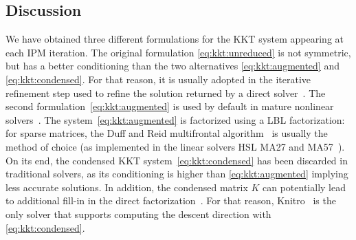 \subsection{Discussion}
We have obtained three different formulations for the KKT system
appearing at each IPM iteration.
The original formulation \eqref{eq:kkt:unreduced} is not symmetric, but
has a better conditioning than the two alternatives \eqref{eq:kkt:augmented}
and \eqref{eq:kkt:condensed}. For that reason, it is usually adopted
in the iterative refinement step used to refine the solution returned by
a direct solver~\cite{wachter2006implementation}. The second formulation~\eqref{eq:kkt:augmented} is
used by default in mature nonlinear solvers~\cite{wachter2006implementation,waltz2006interior}.
The system~\eqref{eq:kkt:augmented} is factorized using a LBL factorization: for sparse matrices, the Duff and Reid
multifrontal algorithm~\cite{duff1983multifrontal} is usually the method of choice (as implemented in the linear solvers HSL
MA27 and MA57~\cite{duff2004ma57}).
On its end, the condensed KKT system~\eqref{eq:kkt:condensed}
has been discarded in traditional solvers, as its conditioning is higher
than \eqref{eq:kkt:augmented} implying less accurate solutions. In addition,
the condensed matrix $K$ can potentially lead to additional fill-in
in the direct factorization~\cite[Section 19.3, p.571]{nocedal_numerical_2006}.
For that reason, Knitro~\cite{waltz2006interior} is the only solver
that supports computing the descent direction with \eqref{eq:kkt:condensed}.


